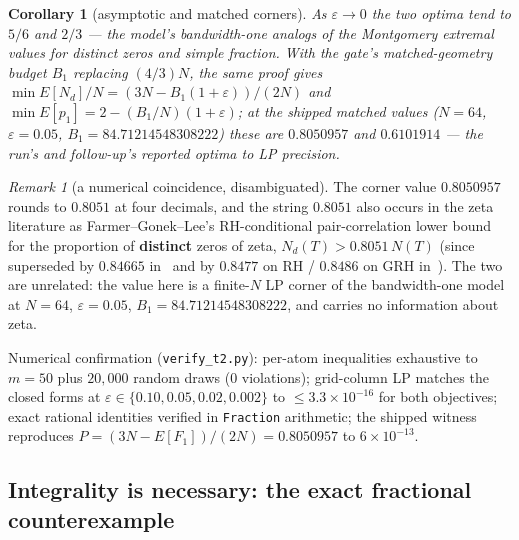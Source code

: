 \documentclass[11pt]{article}
\theoremstyle{plain}
\newtheorem{corollary}[theorem]{Corollary}
\theoremstyle{definition}
\theoremstyle{remark}
\newtheorem*{remk}{Remark}
\newcommand{\Nd}{N_{d}}
\begin{document}
\begin{corollary}[asymptotic and matched corners]
\label{cor:matched}
As $\varepsilon \to 0$ the two optima tend to $5/6$ and $2/3$ --- the model's
bandwidth-one analogs of the Montgomery extremal values for distinct zeros and
simple fraction. With the gate's matched-geometry budget $B_1$ replacing
$(4/3)N$, the same proof gives
$\min E[\Nd]/N = (3N - B_1(1 + \varepsilon))/(2N)$ and
$\min E[p_1] = 2 - (B_1/N)(1 + \varepsilon)$; at the shipped matched values
($N = 64$, $\varepsilon = 0.05$, $B_1 = 84.71214548308222$) these are
$0.8050957$ and $0.6101914$ --- the run's and follow-up's reported optima to LP
precision.
\end{corollary}

\begin{remk}[a numerical coincidence, disambiguated]
The corner value $0.8050957$ rounds to $0.8051$ at four decimals, and the string
$0.8051$ also occurs in the zeta literature as Farmer--Gonek--Lee's RH-conditional
pair-correlation lower bound for the proportion of \textbf{distinct} zeros of zeta,
$\Nd(T) > 0.8051\,N(T)$ \cite[Cor.~1.4]{FGL14} (since superseded by $0.84665$
in~\cite{BHB13} and by $0.8477$ on RH / $0.8486$ on GRH
in~\cite[Cor.~3]{CGdL20}). The two are unrelated: the value here is a finite-$N$ LP
corner of the bandwidth-one model at $N = 64$, $\varepsilon = 0.05$,
$B_1 = 84.71214548308222$, and carries no information about zeta.
\end{remk}

Numerical confirmation (\texttt{verify\_t2.py}): per-atom inequalities exhaustive
to $m = 50$ plus $20{,}000$ random draws ($0$ violations); grid-column LP matches
the closed forms at $\varepsilon \in \{0.10, 0.05, 0.02, 0.002\}$ to
$\le 3.3 \times 10^{-16}$ for both objectives; exact rational identities verified
in \texttt{Fraction} arithmetic; the shipped witness reproduces
$P = (3N - E[F_1])/(2N) = 0.8050957$ to $6 \times 10^{-13}$.

\subsection{Integrality is necessary: the exact fractional counterexample}
\label{sec:fractional}
\end{document}
